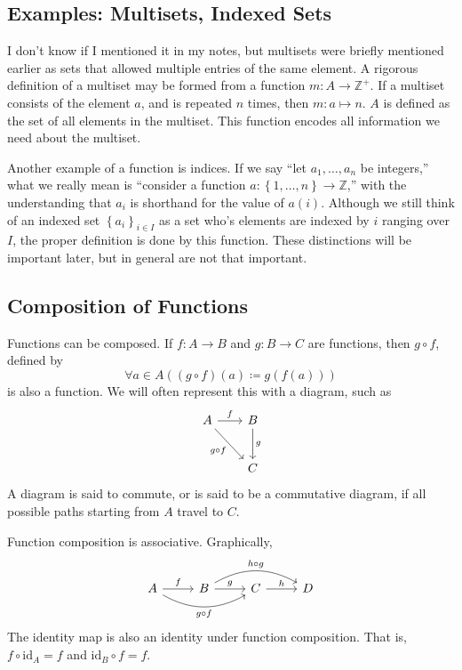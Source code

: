 \subsection{Examples: Multisets, Indexed Sets}
I don't know if I mentioned it in my notes, but multisets were briefly mentioned earlier as sets that allowed multiple entries of the same element. A rigorous definition of a multiset may be formed from a function $m : A \to \mathbb{Z}^+$. If a multiset consists of the element $a$, and is repeated $n$ times, then $m : a \mapsto n$. $A$ is defined as the set of all elements in the multiset. This function encodes all information we need about the multiset.

Another example of a function is indices. If we say ``let $a_1, \dots, a_n $ be integers,'' what we really mean is ``consider a function $a : \left\{ 1, \ldots, n \right\}  \to \mathbb{Z}$,'' with the understanding that $a_i$ is shorthand for the value of $a(i)$. Although we still think of an indexed set $\left\{ a_i \right\}_{i\in I}$ as a set who's elements are indexed by $i$ ranging over $I$, the proper definition is done by this function. These distinctions will be important later, but in general are not that important.
\subsection{Composition of Functions}
Functions can be composed. If $f : A \to B$ and $g : B \to C$ are functions, then $g\circ f$, defined by
\[
	\forall a\in A\left( (g\circ f)(a)\coloneqq g(f(a))  \right) 
\]
is also a function. We will often represent this with a diagram, such as
\[\begin{tikzcd}[row sep=2.5em, column sep=2em]
	A\arrow[r,"f"]\arrow[dr,"g\circ f"']&B\arrow[d,"g"]\\
					    &C
\end{tikzcd}\]
A diagram is said to commute, or is said to be a commutative diagram, if all possible paths starting from $A$ travel to $C$.

Function composition is associative. Graphically,
\[\begin{tikzcd}[row sep=1em, column sep=2.5em]
	A\arrow[r,"f"]\arrow[rr,bend right,"g\circ f"']&B\arrow[r,"g"]\arrow[rr,bend left,"h\circ g"]&C\arrow[r,"h"]&D
\end{tikzcd}\]
The identity map is also an identity under function composition. That is, $f\circ \mathrm{id}_A=f$ and $\mathrm{id}_B\circ f=f$.

